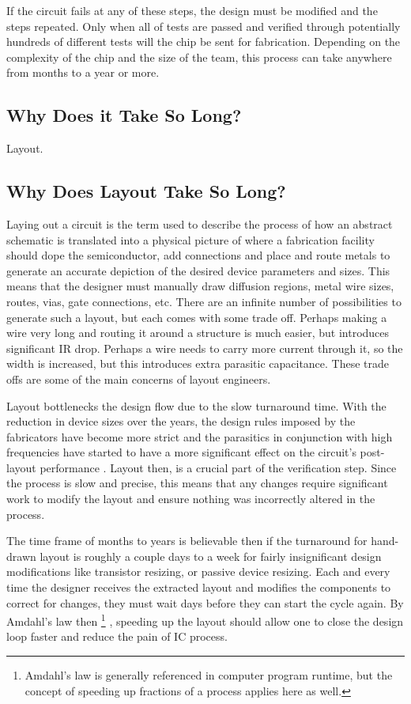 
If the circuit fails at any of these steps, the design must be modified and the steps repeated. Only when all of tests are passed and verified through potentially hundreds of different tests will the chip be sent for fabrication. Depending on the complexity of the chip and the size of the team, this process can take anywhere from months to a year or more.
\subsection{Why Does it Take So Long?}
Layout.

\subsection{Why Does Layout Take So Long?}
Laying out a circuit is the term used to describe the process of how an abstract schematic is translated into a physical picture of where a fabrication facility should dope the semiconductor, add connections and place and route metals to generate an accurate depiction of the desired device parameters and sizes. This means that the designer must manually draw diffusion regions, metal wire sizes, routes, vias, gate connections, etc. There are an infinite number of possibilities to generate such a layout, but each comes with some trade off. Perhaps making a wire very long and routing it around a structure is much easier, but introduces significant IR drop. Perhaps a wire needs to carry more current through it, so the width is increased, but this introduces extra parasitic capacitance. These trade offs are some of the main concerns of layout engineers. 

Layout bottlenecks the design flow due to the slow turnaround time. With the reduction in device sizes over the years, the design rules imposed by the fabricators have become more strict and the parasitics in conjunction with high frequencies have started to have a more significant effect on the circuit's post-layout performance \cite{allen_practice_2004} \cite{lourenco_layout-aware_2015}. Layout then, is a crucial part of the verification step. Since the process is slow and precise, this means that any changes require significant work to modify the layout and ensure nothing was incorrectly altered in the process.

The time frame of months to years is believable then if the turnaround for hand-drawn layout is roughly a couple days to a week for fairly insignificant design modifications like transistor resizing, or passive device resizing. Each and every time the designer receives the extracted layout and modifies the components to correct for changes, they must wait days before they can start the cycle again. By Amdahl's law then \footnote{Amdahl's law is generally referenced in computer program runtime, but the concept of speeding up fractions of a process applies here as well.} \cite{noauthor_amdahls_nodate}, speeding up the layout should allow one to close the design loop faster and reduce the pain of IC process.
